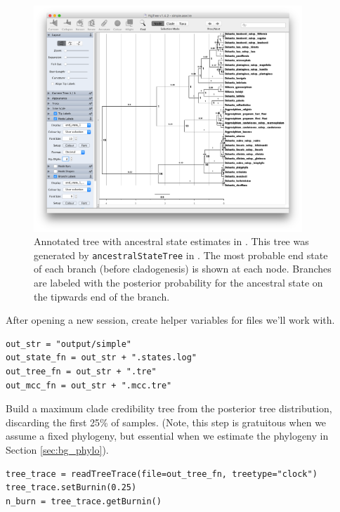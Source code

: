 \begin{figure}[!h]
\centering
\includegraphics[width=0.9\textwidth]{figures/fig_simple_FigTree_ase.png}
\caption{Annotated tree with ancestral state estimates in \FigTree.
This tree was generated by {\tt ancestralStateTree} in \RevBayes.
The most probable end state of each branch (before cladogenesis) is shown at each node.
Branches are labeled with the posterior probability for the ancestral state on the tipwards end of the branch.
}
\label{fig:simple_FigTree_ase}
\end{figure}

After opening a new \RevBayes session, create helper variables for files we'll work with.
\begin{snugshade}
\begin{lstlisting}
out_str = "output/simple"
out_state_fn = out_str + ".states.log"
out_tree_fn = out_str + ".tre"
out_mcc_fn = out_str + ".mcc.tre" 
\end{lstlisting}
\end{snugshade}

Build a maximum clade credibility tree from the posterior tree distribution, discarding the first 25\% of samples.
(Note, this step is gratuitous when we assume a fixed phylogeny, but essential when we estimate the phylogeny in Section \ref{sec:bg_phylo}).

\begin{snugshade}
\begin{lstlisting}
tree_trace = readTreeTrace(file=out_tree_fn, treetype="clock")
tree_trace.setBurnin(0.25)
n_burn = tree_trace.getBurnin()
\end{lstlisting}
\end{snugshade}

